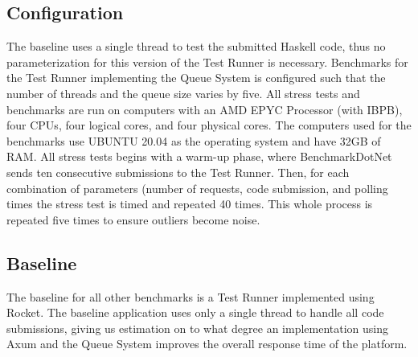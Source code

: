 \subsection{Configuration}
The baseline uses a single thread to test the submitted Haskell code, thus no parameterization for this version of the Test Runner is necessary.
Benchmarks for the Test Runner implementing the Queue System is configured such that the number of threads and the queue size varies by five. 
All stress tests and benchmarks are run on computers with an AMD EPYC Processor (with IBPB), four CPUs, four logical cores, and four physical cores.
The computers used for the benchmarks use UBUNTU 20.04 as the operating system and have 32GB of RAM.
All stress tests begins with a warm-up phase, where BenchmarkDotNet sends ten consecutive submissions to the Test Runner. 
Then, for each combination of parameters (number of requests, code submission, and polling times the stress test is timed and repeated 40 times.
This whole process is repeated five times to ensure outliers become noise.

\subsection{Baseline}
The baseline for all other benchmarks is a Test Runner implemented using Rocket. 
The baseline application uses only a single thread to handle all code submissions, giving us estimation on to what degree an implementation using Axum and the Queue System improves the overall response time of the platform.

